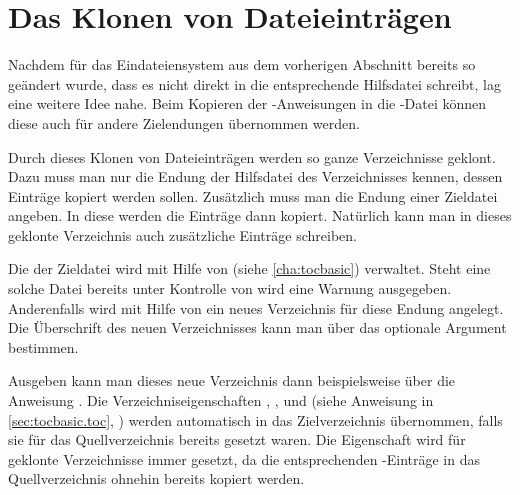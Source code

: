 \section{Das Klonen von Dateieinträgen}

Nachdem  für das Eindateiensystem aus
dem vorherigen Abschnitt bereits so geändert wurde, dass es nicht direkt in
die entsprechende Hilfsdatei schreibt, lag eine weitere Idee nahe. Beim
Kopieren der -Anweisungen in die -Datei können
diese auch für andere Zielendungen übernommen werden.

\begin{Declaration}
\end{Declaration}%
Durch dieses Klonen von Dateieinträgen werden so ganze Verzeichnisse
geklont. Dazu muss man nur die Endung der Hilfsdatei des Verzeichnisses
kennen, dessen Einträge kopiert werden sollen. Zusätzlich muss man die Endung
einer Zieldatei angeben. In diese werden die Einträge dann kopiert. Natürlich
kann man in dieses geklonte Verzeichnis auch zusätzliche Einträge
schreiben.

Die  der Zieldatei wird mit Hilfe von
\hyperref[cha:tocbasic]{}%
 (siehe
\autoref{cha:tocbasic}) verwaltet. Steht eine solche Datei bereits unter
Kontrolle von \hyperref[cha:tocbasic]{} wird eine Warnung
ausgegeben. Anderenfalls wird mit Hilfe von
\hyperref[cha:tocbasic]{} ein neues Verzeichnis für diese
Endung angelegt. Die Überschrift des neuen Verzeichnisses kann man über das
optionale Argument  bestimmen.

Ausgeben kann man dieses neue Verzeichnis dann beispielsweise über die
Anweisung . Die
Verzeichniseigenschaften
, ,  und 
(siehe Anweisung  in
\autoref{sec:tocbasic.toc}, ) werden
automatisch in das Zielverzeichnis übernommen, falls sie für das
Quellverzeichnis bereits gesetzt waren. Die Eigenschaft  wird
für geklonte Verzeichnisse immer gesetzt, da die entsprechenden
-Einträge in das Quellverzeichnis ohnehin bereits kopiert
werden.

